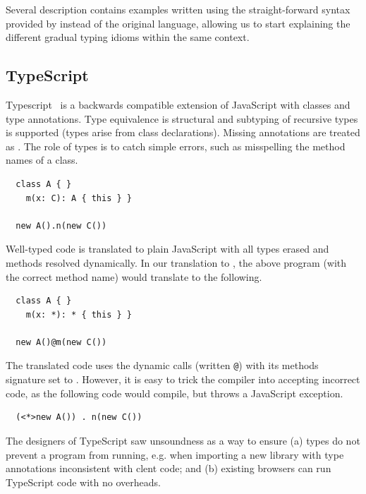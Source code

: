 \documentclass[a4paper,USenglish]{tex/lipics-v2016}
\begin{document}
Several description contains examples written using the straight-forward syntax
provided by \kafka instead of the original language, allowing us to start explaining
the different gradual typing idioms within the same context.


\newcommand{\code}[1]{{\tt #1}\xspace}

\subsection{TypeScript}

Typescript~\cite{BAT14} is a backwards compatible extension of JavaScript
with classes and type annotations. Type equivalence is structural and
subtyping of recursive types is supported (types arise from class
declarations). Missing annotations are treated as \any. The role of types is
to catch simple errors, such as misspelling the method names of a class.

\begin{lstlisting}
  class A { }
    m(x: C): A { this } }

  new A().n(new C())
\end{lstlisting}

Well-typed code is translated to plain JavaScript with all types erased and
methods resolved dynamically. In our translation to \kafka, the above program
(with the correct method name) would translate to the following.

\begin{lstlisting}
  class A { }
    m(x: *): * { this } }

  new A()@m(new C())
\end{lstlisting}

The translated code uses the dynamic calls (written \code @) with its methods signature
set to \any. However, it is easy to trick the compiler into accepting incorrect
code, as the following code would compile, but throws a JavaScript exception.

\begin{lstlisting}
  (<*>new A()) . n(new C())
\end{lstlisting}

The designers of TypeScript saw unsoundness as a way to ensure (a) types do
not prevent a program from running, e.g. when importing a new library with
type annotations inconsistent with clent code; and (b) existing
browsers can run TypeScript code with no overheads.
\end{document}
